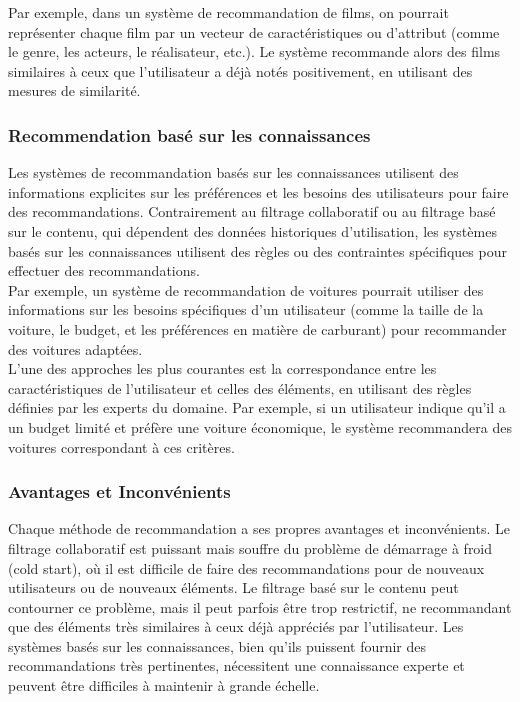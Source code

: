 \documentclass[11pt]{article}
\begin{document}
Par exemple, dans un système de recommandation de films, on pourrait représenter chaque film par un vecteur de caractéristiques ou d'attribut (comme le genre, les acteurs, le réalisateur, etc.). Le système recommande alors des films similaires à ceux que l'utilisateur a déjà notés positivement, en utilisant des mesures de similarité.

\subsubsection{Recommendation basé sur les connaissances}
Les systèmes de recommandation basés sur les connaissances utilisent des informations explicites sur les préférences et les besoins des utilisateurs pour faire des recommandations. Contrairement au filtrage collaboratif ou au filtrage basé sur le contenu, qui dépendent des données historiques d'utilisation, les systèmes basés sur les connaissances utilisent des règles ou des contraintes spécifiques pour effectuer des recommandations.\\

Par exemple, un système de recommandation de voitures pourrait utiliser des informations sur les besoins spécifiques d'un utilisateur (comme la taille de la voiture, le budget, et les préférences en matière de carburant) pour recommander des voitures adaptées.\\

L'une des approches les plus courantes est la correspondance entre les caractéristiques de l'utilisateur et celles des éléments, en utilisant des règles définies par les experts du domaine. Par exemple, si un utilisateur indique qu'il a un budget limité et préfère une voiture économique, le système recommandera des voitures correspondant à ces critères.

\subsubsection{Avantages et Inconvénients}

Chaque méthode de recommandation a ses propres avantages et inconvénients. Le filtrage collaboratif est puissant mais souffre du problème de démarrage à froid (cold start), où il est difficile de faire des recommandations pour de nouveaux utilisateurs ou de nouveaux éléments. Le filtrage basé sur le contenu peut contourner ce problème, mais il peut parfois être trop restrictif, ne recommandant que des éléments très similaires à ceux déjà appréciés par l'utilisateur. Les systèmes basés sur les connaissances, bien qu'ils puissent fournir des recommandations très pertinentes, nécessitent une connaissance experte et peuvent être difficiles à maintenir à grande échelle.
\end{document}
